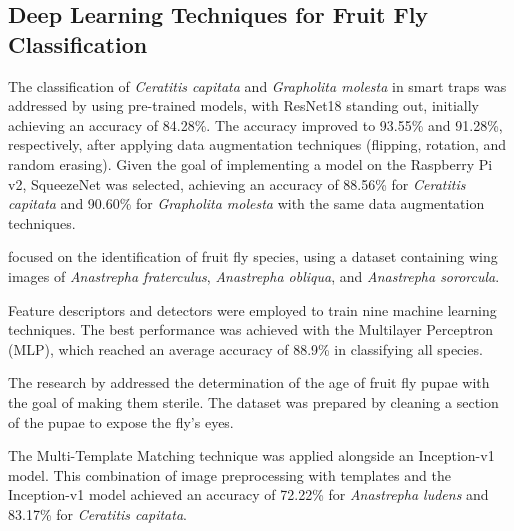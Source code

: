 \subsection{Deep Learning Techniques for Fruit Fly Classification}

The classification of \textit{Ceratitis capitata} and \textit{Grapholita molesta} in smart traps was addressed by \cite{9Martins2019} using pre-trained models, with ResNet18 standing out, initially achieving an accuracy of 84.28\%. The accuracy improved to 93.55\% and 91.28\%, respectively, after applying data augmentation techniques (flipping, rotation, and random erasing). Given the goal of implementing a model on the Raspberry Pi v2, SqueezeNet was selected, achieving an accuracy of 88.56\% for \textit{Ceratitis capitata} and 90.60\% for \textit{Grapholita molesta} with the same data augmentation techniques.

\cite{13Leonardo2017} focused on the identification of fruit fly species, using a dataset containing wing images of \textit{Anastrepha fraterculus}, \textit{Anastrepha obliqua}, and \textit{Anastrepha sororcula}.

Feature descriptors and detectors were employed to train nine machine learning techniques. The best performance was achieved with the Multilayer Perceptron (MLP), which reached an average accuracy of 88.9\% in classifying all species.

The research by \cite{15Gonzalez-Lopez2022} addressed the determination of the age of fruit fly pupae with the goal of making them sterile. The dataset was prepared by cleaning a section of the pupae to expose the fly’s eyes.

The Multi-Template Matching technique was applied alongside an Inception-v1 model. This combination of image preprocessing with templates and the Inception-v1 model achieved an accuracy of 72.22\% for \textit{Anastrepha ludens} and 83.17\% for \textit{Ceratitis capitata}.
